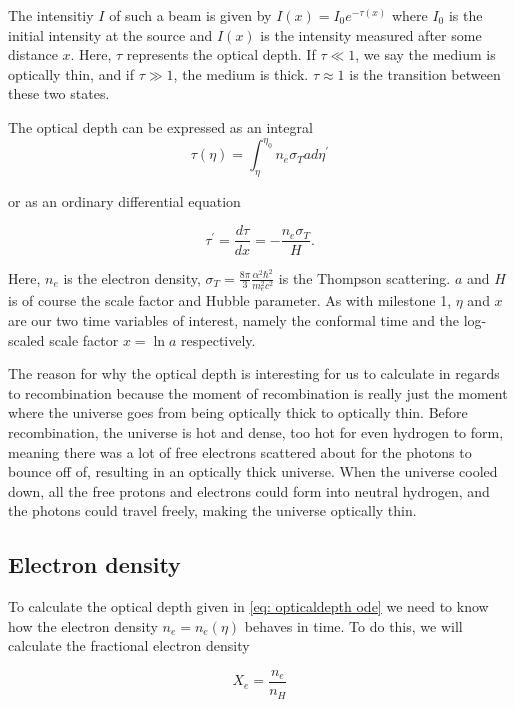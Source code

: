 \documentclass[12pt]{article}
\begin{document}
The intensitiy $I$ of such a beam is given by $I(x)=I_0e^{-\tau(x)}$ where $I_0$ is the initial intensity at the source and $I(x)$ is the intensity measured after some distance $x$. Here, $\tau$ represents the optical depth. If $\tau \ll 1$, we say the medium is optically thin, and if $\tau \gg 1$, the medium is thick. $\tau \approx 1$ is the transition between these two states.

The optical depth can be expressed as an integral
\begin{equation}\label{eq:opticaldepth integral}
    \tau(\eta)=\int_{\eta}^{\eta_{0}} n_{e} \sigma_{T} a d \eta^{\prime}
\end{equation}

or as an ordinary differential equation

\begin{equation}\label{eq: opticaldepth ode}
    \tau^{\prime}=\frac{d \tau}{d x}=-\frac{n_{e} \sigma_{T}}{H}.
\end{equation}

Here, $n_e$ is the electron density, $\sigma_T = \frac{8 \pi}{3} \frac{\alpha^{2} \hbar^{2}}{m_{e}^{2} c^{2}}$ is the Thompson scattering. $a$ and $H$ is of course the scale factor and Hubble parameter. As with milestone 1, $\eta$ and $x$ are our two time variables of interest, namely the conformal time and the log-scaled scale factor $x = \ln{a}$ respectively.

The reason for why the optical depth is interesting for us to calculate in regards to recombination because the moment of recombination is really just the moment where the universe goes from being optically thick to optically thin. Before recombination, the universe is hot and dense, too hot for even hydrogen to form, meaning there was a lot of free electrons scattered about for the photons to bounce off of, resulting in an optically thick universe. When the universe cooled down, all the free protons and electrons could form into neutral hydrogen, and the photons could travel freely, making the universe optically thin. 


\subsection{Electron density}
To calculate the optical depth given in \cref{eq: opticaldepth ode} we need to know how the electron density $n_e = n_e(\eta)$ behaves in time. To do this, we will calculate the fractional electron density

\begin{equation}\label{eq: x_e}
    X_{e} = \frac{n_{e}}{n_{H}}
\end{equation}
\end{document}
